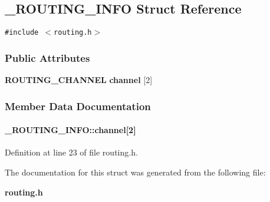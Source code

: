 \subsection{\_\-ROUTING\_\-INFO  Struct Reference}
\label{_ROUTING_INFO}
{\tt \#include $<$routing.h$>$}

\subsubsection*{Public Attributes}
\begin{CompactItemize}
\item 
{\bf ROUTING\_\-CHANNEL} {\bf channel} [2]
\end{CompactItemize}


\subsubsection{Member Data Documentation}
\label{_ROUTING_INFO_m0}
\paragraph{ \_\-ROUTING\_\-INFO::channel[2]}\hfill



Definition at line 23 of file routing.h.

The documentation for this struct was generated from the following file:\begin{CompactItemize}
\item 
{\bf routing.h}\end{CompactItemize}
